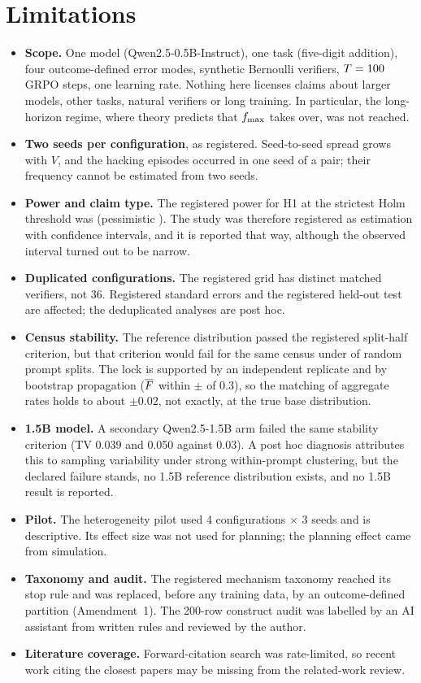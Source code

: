\section{Limitations}\label{sec:limits}
\begin{itemize}
\item \textbf{Scope.} One model (Qwen2.5-0.5B-Instruct), one task (five-digit addition), four outcome-defined error modes, synthetic Bernoulli verifiers, $T=100$ GRPO steps, one learning rate. Nothing here licenses claims about larger models, other tasks, natural verifiers or long training. In particular, the long-horizon regime, where theory predicts that $f_{\max}$ takes over, was not reached.
\item \textbf{Two seeds per configuration}, as registered. Seed-to-seed spread grows with $V$, and the hacking episodes occurred in one seed of a pair; their frequency cannot be estimated from two seeds.
\item \textbf{Power and claim type.} The registered power for H1 at the strictest Holm threshold was \PowC{} (pessimistic \PowPessC). The study was therefore registered as estimation with confidence intervals, and it is reported that way, although the observed interval turned out to be narrow.
\item \textbf{Duplicated configurations.} The registered grid has \NuniqueMatched{} distinct matched verifiers, not 36. Registered standard errors and the registered held-out test are affected; the deduplicated analyses are post hoc.
\item \textbf{Census stability.} The reference distribution passed the registered split-half criterion, but that criterion would fail for the same census under \TVpfail{} of random prompt splits. The lock is supported by an independent replicate and by bootstrap propagation ($\overline{F}$ within $\pm$\FbarDev{} of 0.3), so the matching of aggregate rates holds to about $\pm0.02$, not exactly, at the true base distribution.
\item \textbf{1.5B model.} A secondary Qwen2.5-1.5B arm failed the same stability criterion (TV 0.039 and 0.050 against 0.03). A post hoc diagnosis attributes this to sampling variability under strong within-prompt clustering, but the declared failure stands, no 1.5B reference distribution exists, and no 1.5B result is reported.
\item \textbf{Pilot.} The heterogeneity pilot used 4 configurations $\times$ 3 seeds and is descriptive. Its effect size was not used for planning; the planning effect came from simulation.
\item \textbf{Taxonomy and audit.} The registered mechanism taxonomy reached its stop rule and was replaced, before any training data, by an outcome-defined partition (Amendment~1). The 200-row construct audit was labelled by an AI assistant from written rules and reviewed by the author.
\item \textbf{Literature coverage.} Forward-citation search was rate-limited, so recent work citing the closest papers may be missing from the related-work review.
\end{itemize}

